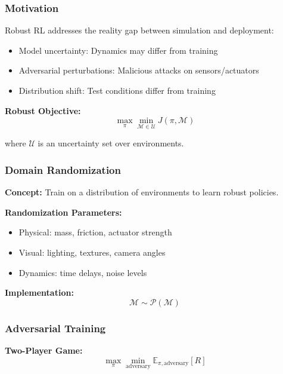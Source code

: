 \documentclass[12pt]{article}
\begin{document}
{{{{\subsubsection{Motivation}

Robust RL addresses the reality gap between simulation and deployment:
\begin{itemize}
\item Model uncertainty: Dynamics may differ from training
\item Adversarial perturbations: Malicious attacks on sensors/actuators
\item Distribution shift: Test conditions differ from training
\end{itemize}

\textbf{Robust Objective:}
\begin{equation}
\max_\pi \min_{\mathcal{M} \in \mathcal{U}} J(\pi, \mathcal{M})
\end{equation}

where $\mathcal{U}$ is an uncertainty set over environments.

\subsubsection{Domain Randomization}

\textbf{Concept:} Train on a distribution of environments to learn robust policies.

\textbf{Randomization Parameters:}
\begin{itemize}
\item Physical: mass, friction, actuator strength
\item Visual: lighting, textures, camera angles
\item Dynamics: time delays, noise levels
\end{itemize}

\textbf{Implementation:}
\begin{equation}
\mathcal{M} \sim \mathcal{P}(\mathcal{M})
\end{equation}

\subsubsection{Adversarial Training}

\textbf{Two-Player Game:}
\begin{equation}
\max_\pi \min_{\text{adversary}} \mathbb{E}_{\pi, \text{adversary}}[R]
\end{equation}

}}}}
\end{document}

